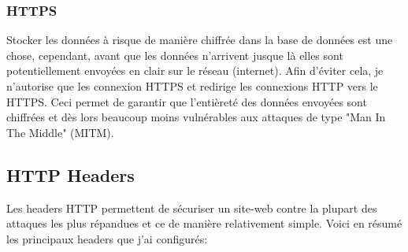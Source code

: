 \subsubsection{HTTPS}
Stocker les données à risque de manière chiffrée dans la base de données est une chose, cependant, avant que les données n'arrivent jusque là elles sont potentiellement envoyées en clair sur le réseau (internet). Afin d'éviter cela, je n'autorise que les connexion HTTPS et redirige les connexions HTTP vers le HTTPS. Ceci permet de garantir que l'entièreté des données envoyées sont chiffrées et dès lors beaucoup moins vulnérables aux attaques de type "Man In The Middle" (MITM).

\newpage

\subsection{HTTP Headers}

Les headers HTTP permettent de sécuriser un site-web contre la plupart des attaques les plus répandues et ce de manière relativement simple. Voici en résumé les principaux headers que j'ai configurés:

